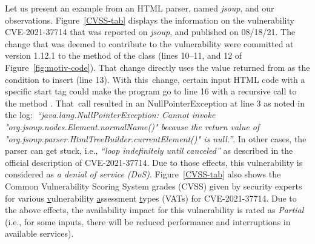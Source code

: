 

Let us present an example from an HTML parser, named {\em jsoup}, and
our observations. Figure~\ref{CVSS-tab} displays the information on the
vulnerability CVE-2021-37714 that was reported on {\em jsoup}, and
published on 08/18/21. The change that was deemed to contribute to the
vulnerability were committed at version 1.12.1 to the method
 of the
 class (lines 10--11, and 12 of
Figure~\ref{fig:motiv-code}). That change directly uses the value
returned from  as the condition to
insert  (line 13). With this~change, certain input HTML
code with a specific start tag could make the program go to line 16
with a recursive call to the method . That~call
resulted in an NullPointerException at line 3 as noted in the
log:~{\em ``java.\-lang.\-Null\-Pointer\-Ex\-ception: Cannot invoke
  "org.\-jsoup.\-nodes.\-Element.\-normalName()" because the return
  value of
  "org.\-jsoup.\-parser.\-HtmlTree\-Builder.\-current\-Element()" is
  null.''}. In other cases, the parser can get stuck, i.e., {\em
  ``loop indefinitely until canceled''} as described in the official
description of CVE-2021-37714. Due
to those effects, this vulnerability is considered as {\em a denial of
  service (DoS)}. Figure~\ref{CVSS-tab} also shows the Common
Vulnerability Scoring System grades (CVSS) given by security experts
for various \underline{v}ulnerability \underline{a}ssessment
\underline{t}ypes (VATs) for CVE-2021-37714. Due to the above effects,
the availability impact for this vulnerability is rated as {\em
  Partial} (i.e., for some inputs, there will be reduced performance
and interruptions in available services).

